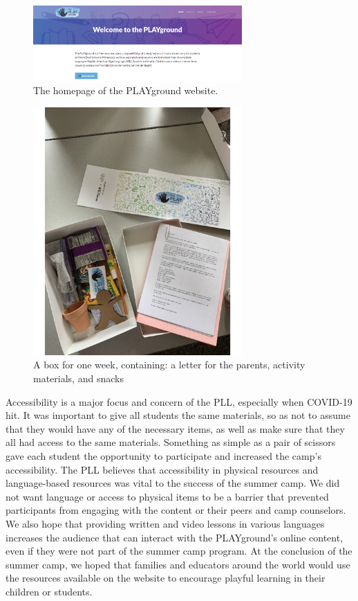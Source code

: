 \documentclass[11.5pt]{sig-alternate}
\begin{document}
\begin{large}
\begin{figure}[h]
    \centering
    \includegraphics[width=8cm]{figure 1.png}
    \caption{The homepage of the PLAYground website.}
\end{figure}

\begin{figure}[h]
    \centering
    \includegraphics[width=8cm]{figure 2.png}
    \caption{A box for one week, containing: a letter for the parents, activity materials, and snacks}
\end{figure}

Accessibility is a major focus and concern of the PLL, especially when COVID-19 hit. It was important to give all students the same materials, so as not to assume that they would have any of the necessary items, as well as make sure that they all had access to the same materials. Something as simple as a pair of scissors gave each student the opportunity to participate and increased the camp’s accessibility. The PLL believes that accessibility in physical resources and language-based resources was vital to the success of the summer camp. We did not want language or access to physical items to be a barrier that prevented participants from engaging with the content or their peers and camp counselors. We also hope that providing written and video lessons in various languages increases the audience that can interact with the PLAYground’s online content, even if they were not part of the summer camp program. At the conclusion of the summer camp, we hoped that families and educators around the world would use the resources available on the website to encourage playful learning in their children or students. 


\end{large}
\end{document}

